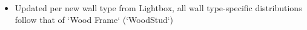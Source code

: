 \begin{itemize}
\item Updated per new wall type from Lightbox, all wall type-specific distributions follow that of `Wood Frame` (`WoodStud`)
\end{itemize}
